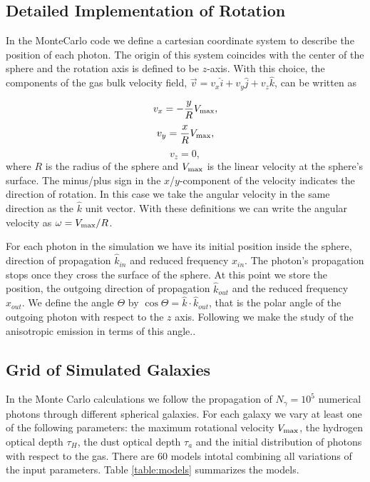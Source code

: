 \documentclass{emulateapj}
\begin{document}
\subsection{Detailed Implementation of Rotation}

 In the MonteCarlo code we define a cartesian coordinate system to
 describe the position of each photon. The origin of this system
 coincides with the center of the sphere and the rotation axis is defined
 to be $z$-axis. With this choice, the components of the gas bulk velocity
 field, $\vec{v} = v_{x}\hat{i} + v_{y}\hat{j} + v_{z}\hat{k}$, can be
 written as  
  
\begin{equation}
    v_{x}=-\frac{y}{R}V_{\rm max}, \label{subeq1}
\end{equation}
\begin{equation}
    v_{y}=\frac{x}{R}V_{\rm max}, \label{subeq2}
\end{equation}
\begin{equation}
    v_{z}=0, \label{subeq3}
\end{equation}
%
where $R$ is the radius of the sphere and $V_{\rm max}$ is the linear
velocity at the sphere's surface. The minus/plus sign in the
$x$/$y$-component of the velocity indicates the direction of
rotation. In this case we take the angular velocity in the same
direction as the $\hat{k}$ unit vector. With these definitions we can
write the angular velocity as $\omega=V_{\rm max}/R$.  

For each photon in the simulation we have its initial position inside
the sphere, direction of propagation $\hat{k}_{in}$ and reduced
frequency $x_{in}$. The photon's propagation stops once they cross the
surface of the sphere. At this point we store the position, the outgoing direction
of propagation $\hat{k}_{out}$ and the reduced frequency $x_{out}$. We
define the angle $\Theta$ by $\cos\Theta = \hat{k}\cdot
\hat{k}_{out}$, that is the polar angle of the outgoing photon with
respect to the $z$ axis. Following \cite{Zheng2013} we make the study
of the anisotropic emission in terms of this angle..



\subsection{Grid of Simulated Galaxies}
\label{sec:models}

In the Monte Carlo calculations we follow the propagation of $N_{\gamma}=10^5$
numerical photons through different spherical galaxies. For each galaxy
we vary at least one of the following parameters: the maximum
rotational velocity $V_{\rm max}$, the hydrogen optical depth $\tau_{H}$,
the dust optical depth $\tau_{a}$ and the initial distribution of photons
with respect to the gas. There are $60$ models intotal combining all
variations of the input parameters. Table \ref{table:models}
summarizes the models.
\end{document}
